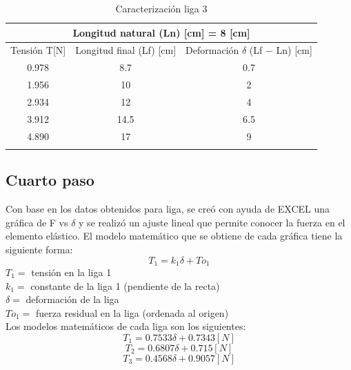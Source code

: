 \documentclass[12pt, titlepage]{report}
\begin{document}
    \newpage
    \begin{longtable}{|c|c|c|}
        \hline
        \multicolumn{3}{|c|}{Longitud natural (Ln) [cm] = 8 [cm]} \\ \hline
        Tensión T[N] & Longitud final (Lf) [cm] & Deformación $\delta$  (Lf $-$ Ln) [cm] \\ \hline
        0.978 & 8.7 & 0.7 \\ \hline
        1.956 & 10 & 2 \\ \hline
        2.934 & 12 & 4 \\ \hline
        3.912 & 14.5 & 6.5 \\ \hline
        4.890 & 17 & 9 \\ \hline
        \caption{Caracterización liga 3}
    \end{longtable}

    \subsection*{Cuarto paso}
    Con base en los datos obtenidos para liga, se creó con ayuda de EXCEL una gráfica de F vs $\delta$ y se realizó un ajuste lineal que permite conocer la fuerza en el elemento elástico. El modelo matemático que se obtiene de cada gráfica tiene la siguiente forma: 
    $$T_1=k_1\delta+To_1$$
    $T_1= $ tensión en la liga 1 \\
    $k_1= $ constante de la liga 1 (pendiente de la recta) \\
    $\delta= $ deformación de la liga \\
    $To_1= $ fuerza residual en la liga (ordenada al origen)\\

    Los modelos matemáticos de cada liga son los siguientes:
    $$T_1 = 0.7533\delta + 0.7343 [N]$$
    $$T_2 = 0.6807\delta + 0.715 [N]$$
    $$T_3 = 0.4568\delta + 0.9057 [N]$$
\end{document}
